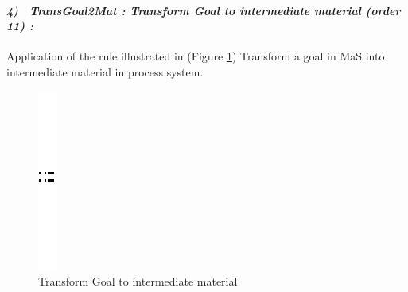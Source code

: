 \paragraph{\emph{4)~ TransGoal2Mat : Transform Goal to intermediate material (order 11) :} }
Application of the rule illustrated in (Figure \ref{fig:Transform Goal to intermediate material}) Transform a goal in MaS into intermediate material in process system.
 
\begin{figure}[th]
\centering 
	\quad{}
		\includegraphics{ch3/img/sep}
	\quad{}
\caption{\label{fig:Transform Goal to intermediate material}Transform Goal to intermediate material}
 
\end{figure}
\pagebreak
